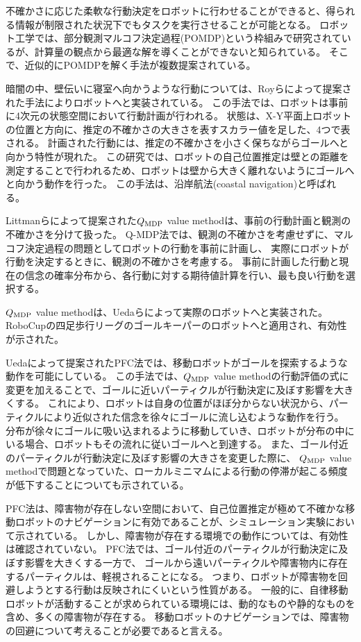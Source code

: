 不確かさに応じた柔軟な行動決定をロボットに行わせることができると、得られる情報が制限された状況下でもタスクを実行させることが可能となる。
ロボット工学では、部分観測マルコフ決定過程(POMDP)という枠組みで研究されているが、計算量の観点から最適な解を導くことができないと知られている\cite{kaelbling1998}。
そこで、近似的にPOMDPを解く手法が複数提案されている。

暗闇の中、壁伝いに寝室へ向かうような行動については、Royらによって提案された手法によりロボットへと実装されている\cite{roy1999b}。
この手法では、ロボットは事前に4次元の状態空間において行動計画が行われる。
状態は、X-Y平面上ロボットの位置と方向に、推定の不確かさの大きさを表すスカラー値を足した、4つで表される。
計画された行動には、推定の不確かさを小さく保ちながらゴールへと向かう特性が現れた。
この研究では、ロボットの自己位置推定は壁との距離を測定することで行われるため、ロボットは壁から大きく離れないようにゴールへと向かう動作を行った。
この手法は、沿岸航法(coastal navigation)と呼ばれる。

Littmanらによって提案された$Q_{\rm MDP}$ value method\cite{littman1995}は、事前の行動計画と観測の不確かさを分けて扱った。
Q-MDP法では、観測の不確かさを考慮せずに、マルコフ決定過程の問題としてロボットの行動を事前に計画し、
実際にロボットが行動を決定するときに、観測の不確かさを考慮する。
事前に計画した行動と現在の信念の確率分布から、各行動に対する期待値計算を行い、最も良い行動を選択する。

$Q_{\rm MDP}$ value methodは、Uedaらによって実際のロボットへと実装された\cite{ueda2003iros}。
RoboCupの四足歩行リーグのゴールキーパーのロボットへと適用され、有効性が示された。

Uedaによって提案されたPFC法では、移動ロボットがゴールを探索するような動作を可能にしている\cite{ueda2015}。
この手法では、$Q_{\rm MDP}$ value methodの行動評価の式に変更を加えることで、ゴールに近いパーティクルが行動決定に及ぼす影響を大きくする。
これにより、ロボットは自身の位置がほぼ分からない状況から、パーティクルにより近似された信念を徐々にゴールに流し込むような動作を行う。
分布が徐々にゴールに吸い込まれるように移動していき、ロボットが分布の中にいる場合、ロボットもその流れに従いゴールへと到達する。
また、ゴール付近のパーティクルが行動決定に及ぼす影響の大きさを変更した際に、
$Q_{\rm MDP}$ value methodで問題となっていた、ローカルミニマムによる行動の停滞が起こる頻度が低下することについても示されている\cite{ueda2018searching}。

PFC法は、障害物が存在しない空間において、自己位置推定が極めて不確かな移動ロボットのナビゲーションに有効であることが、シミュレーション実験において示されている。
しかし、障害物が存在する環境での動作については、有効性は確認されていない。
PFC法では、ゴール付近のパーティクルが行動決定に及ぼす影響を大きくする一方で、
ゴールから遠いパーティクルや障害物内に存在するパーティクルは、軽視されることになる。
つまり、ロボットが障害物を回避しようとする行動は反映されにくいという性質がある。
一般的に、自律移動ロボットが活動することが求められている環境には、動的なものや静的なものを含め、多くの障害物が存在する。
移動ロボットのナビゲーションでは、障害物の回避について考えることが必要であると言える。


